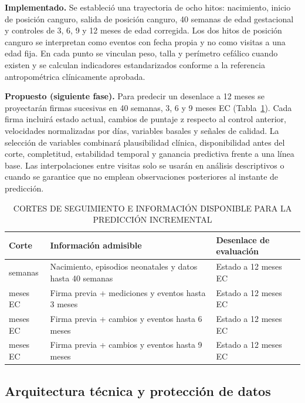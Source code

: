 \documentclass[letterpaper,10pt]{article}
\begin{document}
\textbf{Implementado.} Se estableció una trayectoria de ocho hitos: nacimiento, inicio de posición canguro, salida de posición canguro, 40 semanas de edad gestacional y controles de 3, 6, 9 y 12 meses de edad corregida. Los dos hitos de posición canguro se interpretan como eventos con fecha propia y no como visitas a una edad fija. En cada punto se vinculan peso, talla y perímetro cefálico cuando existen y se calculan indicadores estandarizados conforme a la referencia antropométrica clínicamente aprobada.

\textbf{Propuesto (siguiente fase).} Para predecir un desenlace a 12 meses se proyectarán firmas sucesivas en 40 semanas, 3, 6 y 9 meses EC (Tabla~\ref{tab:cortes}). Cada firma incluirá estado actual, cambios de puntaje z respecto al control anterior, velocidades normalizadas por días, variables basales y señales de calidad. La selección de variables combinará plausibilidad clínica, disponibilidad antes del corte, completitud, estabilidad temporal y ganancia predictiva frente a una línea base. Las interpolaciones entre visitas solo se usarán en análisis descriptivos o cuando se garantice que no emplean observaciones posteriores al instante de predicción.

\begin{table}[!htb]
\centering
\caption{CORTES DE SEGUIMIENTO E INFORMACIÓN DISPONIBLE PARA LA PREDICCIÓN INCREMENTAL}
\label{tab:cortes}
\small
\begin{tabular}{>{\raggedright\arraybackslash}p{}>{\raggedright\arraybackslash}p{}>{\raggedright\arraybackslash}p{}}
\toprule
Corte & Información admisible & Desenlace de evaluación \\
\midrule
40 semanas & Nacimiento, episodios neonatales y datos hasta 40 semanas & Estado a 12 meses EC \\
3 meses EC & Firma previa + mediciones y eventos hasta 3 meses & Estado a 12 meses EC \\
6 meses EC & Firma previa + cambios y eventos hasta 6 meses & Estado a 12 meses EC \\
9 meses EC & Firma previa + cambios y eventos hasta 9 meses & Estado a 12 meses EC \\
\bottomrule
\end{tabular}
\end{table}

\subsection{Arquitectura técnica y protección de datos}
\end{document}
